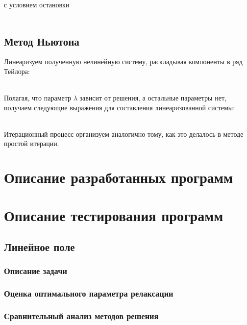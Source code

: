 \documentclass[12pt]{article}
\begin{document}
\noindent
с условием остановки

\begin{align}
\end{align}

\subsection{Метод Ньютона}

\noindent
Линеаризуем полученную нелинейную систему, раскладывая компоненты в ряд Тейлора:

\begin{align}
\end{align}

\noindent
Полагая, что параметр $\lambda$ зависит от решения, а остальные параметры нет,
получаем следующие выражения для составления линеаризованной системы:

\begin{align}
\end{align}

\noindent
Итерационный процесс организуем аналогично тому, как это делалось в методе
простой итерации.

\section{Описание разработанных программ}

\section{Описание тестирования программ}

\subsection{Линейное поле}

\subsubsection{Описание задачи}

\subsubsection{Оценка оптимального параметра релаксации}

\subsubsection{Сравнительный анализ методов решения}
\end{document}

